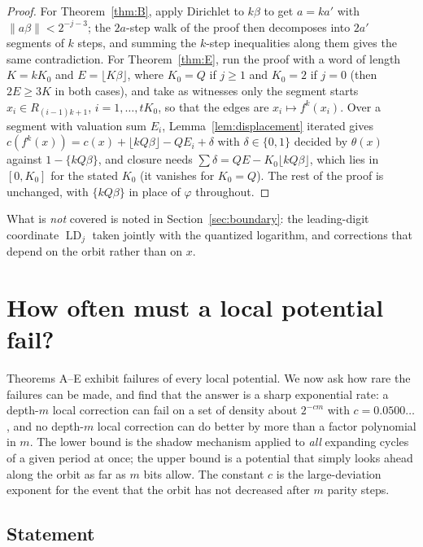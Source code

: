 \documentclass[11pt]{article}
\theoremstyle{definition}
\theoremstyle{remark}
\newcommand{\LD}{\operatorname{LD}}
\begin{document}
\begin{proof}
For Theorem~\ref{thm:B}, apply Dirichlet to $k\beta$ to get
$a=ka'$ with $\|a\beta\|<2^{-j-3}$; the $2a$-step walk of the proof then
decomposes into $2a'$ segments of $k$ steps, and summing the $k$-step
inequalities along them gives the same contradiction. For
Theorem~\ref{thm:E}, run the proof with a word of length $K=kK_0$ and
$E=\lfloor K\beta\rfloor$, where $K_0=Q$ if $j\ge1$ and $K_0=2$ if
$j=0$ (then $2E\ge3K$ in both cases), and take as witnesses only the
segment starts $x_i\in R_{(i-1)k+1}$, $i=1,\dots,tK_0$, so that the edges
are $x_i\mapsto f^{k}(x_i)$. Over a segment with valuation sum $E_i$,
Lemma~\ref{lem:displacement} iterated gives
$c(f^{k}(x))=c(x)+\lfloor kQ\beta\rfloor-QE_i+\delta$ with
$\delta\in\{0,1\}$ decided by $\theta(x)$ against $1-\{kQ\beta\}$, and
closure needs $\sum\delta=QE-K_0\lfloor kQ\beta\rfloor$, which lies in
$[0,K_0]$ for the stated $K_0$ (it vanishes for $K_0=Q$). The rest of the
proof is unchanged, with $\{kQ\beta\}$ in place of $\varphi$ throughout.
\end{proof}

What is \emph{not} covered is noted in Section~\ref{sec:boundary}:
the leading-digit coordinate $\LD_j$ taken jointly with the quantized
logarithm, and corrections that depend on the orbit rather than on $x$.

\section{How often must a local potential fail?}\label{sec:density}

Theorems A--E exhibit failures of every local potential. We now ask how
rare the failures can be made, and find that the answer is a sharp
exponential rate: a depth-$m$ local correction can fail on a set of
density about $2^{-cm}$ with $c=0.0500\ldots$, and no depth-$m$ local
correction can do better by more than a factor polynomial in $m$. The
lower bound is the shadow mechanism applied
to \emph{all} expanding cycles of a given period at once; the upper bound
is a potential that simply looks ahead along the orbit as far as $m$ bits
allow. The constant $c$ is the large-deviation exponent for the event that
the orbit has not decreased after $m$ parity steps.

\subsection*{Statement}
\end{document}
